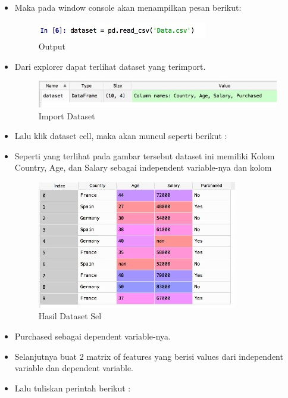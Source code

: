 \begin{enumerate}
\begin{itemize}
\item Maka pada window console akan menampilkan pesan berikut:

\begin{figure}[ht]
\centering
\includegraphics[scale=0.8]{figures/Chapter3AnnisaFathoroni6.jpeg}
\caption{Output}
\label{contoh}
\end{figure}

\item Dari explorer dapat terlihat dataset yang terimport.

\begin{figure}[ht]
\centering
\includegraphics[scale=0.5]{figures/Chapter3AnnisaFathoroni7.jpeg}
\caption{Import Dataset}
\label{contoh}
\end{figure}

\item Lalu klik dataset cell, maka akan muncul seperti berikut :
\item Seperti yang terlihat pada gambar tersebut dataset ini memiliki Kolom Country, Age, dan Salary sebagai independent variable-nya dan kolom

\begin{figure}[ht]
\centering
\includegraphics[scale=0.5]{figures/Chapter3AnnisaFathoroni8.jpeg}
\caption{Hasil Dataset Sel}
\label{contoh}
\end{figure}

\item Purchased sebagai dependent variable-nya.
\item Selanjutnya buat 2 matrix of features yang berisi values dari independent variable dan dependent variable.
\item Lalu tuliskan perintah berikut :


\end{itemize}
\end{enumerate}
